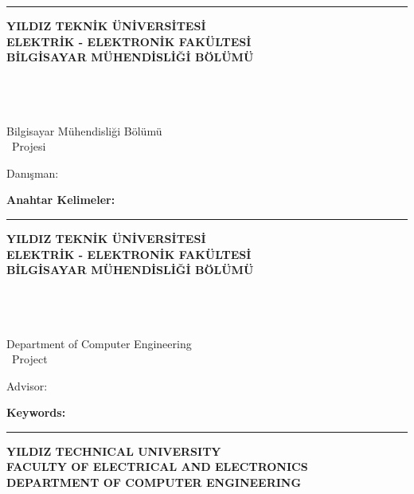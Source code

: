 \vfill

\begin{center}
\rule{0.8\textwidth}{.1pt}

\bfseries \small
YILDIZ TEKNİK ÜNİVERSİTESİ\\
ELEKTRİK - ELEKTRONİK FAKÜLTESİ\\
BİLGİSAYAR MÜHENDİSLİĞİ BÖLÜMÜ
\end{center}

\else
\newpage
\chapter*{\tabstract}

\begin{center}
{\bfseries \Large\titleTR}

\studenti \\ \studentii

Bilgisayar Mühendisliği Bölümü \\ {\tdegree~Projesi}

Danışman: \advisorTR

\end{center}

\abstractTextTurkish

{\bfseries Anahtar Kelimeler:} \abstractKeywordsTurkish

\vfill

\begin{center}
\rule{0.8\textwidth}{.1pt}

\bfseries \small
YILDIZ TEKNİK ÜNİVERSİTESİ\\
ELEKTRİK - ELEKTRONİK FAKÜLTESİ\\
BİLGİSAYAR MÜHENDİSLİĞİ BÖLÜMÜ
\end{center}

\newpage
\chapter*{\eabstract}

\begin{center}
{\bfseries \Large\titleEN}

\studenti \\ \studentii

Department of Computer Engineering \\ {\degree~Project}

Advisor: \advisorEN

\end{center}

\abstractTextEnglish

{\bfseries Keywords:} \abstractKeywordsEnglish

\vfill

\begin{center}
\rule{0.8\textwidth}{.1pt}

\bfseries \small
 YILDIZ TECHNICAL UNIVERSITY\\
 FACULTY OF ELECTRICAL AND ELECTRONICS\\
 DEPARTMENT OF COMPUTER ENGINEERING
\end{center}

\fi
\fi
